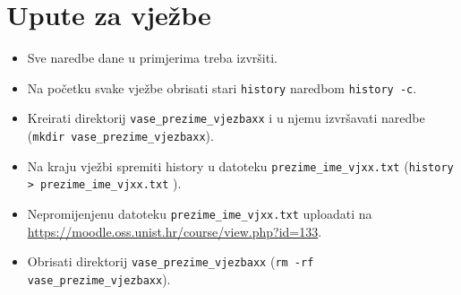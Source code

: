 \section*{Upute za vježbe}
\begin{itemize}
\item Sve naredbe dane u primjerima treba izvršiti.
\item Na početku svake vježbe obrisati stari \texttt{history} naredbom \texttt{history -c}.
\item Kreirati direktorij \texttt{vase\_prezime\_vjezbaxx} i u njemu izvršavati naredbe (\lstinline!mkdir vase_prezime_vjezbaxx!).
 \item Na kraju vježbi spremiti history u datoteku \texttt{prezime\_ime\_vjxx.txt} (\lstinline!history > prezime_ime_vjxx.txt! ).
 \item Nepromijenjenu datoteku \texttt{prezime\_ime\_vjxx.txt} uploadati na \url{https://moodle.oss.unist.hr/course/view.php?id=133}.
 \item Obrisati direktorij \texttt{vase\_prezime\_vjezbaxx} (\lstinline!rm -rf vase_prezime_vjezbaxx!).
\end{itemize}
